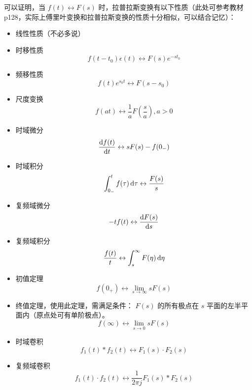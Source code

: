 \documentclass[UTF8,a4paper,11pt]{article}
\begin{document}
可以证明，当 $f(t)\leftrightarrow F(s)$ 时，拉普拉斯变换有以下性质（此处可参考教材p128，实际上傅里叶变换和拉普拉斯变换的性质十分相似，可以结合记忆）：
\begin{itemize}
\item 线性性质（不必多说）
\item 时移性质
\begin{equation}
f(t-t_0)\epsilon(t)\leftrightarrow F(s)e^{-st_0}
\end{equation}
\item 频移性质
\begin{equation}
f(t)e^{s_0 t}\leftrightarrow F(s-s_0)
\end{equation}
\item 尺度变换
\begin{equation}
f(at)\leftrightarrow \frac{1}{a}F(\frac{s}{a}), a>0
\end{equation}
\item 时域微分
\begin{equation}
\frac{{\rm d}f(t)}{{\rm d}t}\leftrightarrow sF(s)-f(0_-)
\end{equation}
\item 时域积分
\begin{equation}
\int_{0_-}^t {f(\tau)} \,{\rm d}\tau\leftrightarrow\frac{F(s)}{s}
\end{equation}
\item 复频域微分
\begin{equation}
-tf(t)\leftrightarrow \frac{{\rm d}F(s)}{{\rm d}s}
\end{equation}
\item 复频域积分
\begin{equation}
\frac{f(t)}{t}\leftrightarrow \int_s^{\infty} {F(\eta)} \,{\rm d}\eta
\end{equation}
\item 初值定理
\begin{equation}
f(0_+)\leftrightarrow \lim_{s \to \infty}sF(s)
\end{equation}
\item 终值定理，使用此定理，需满足条件： $F(s)$ 的所有极点在 $s$ 平面的左半平面内（原点处可有单阶极点）。
\begin{equation}
f(\infty)\leftrightarrow \lim_{s \to 0}sF(s)
\end{equation}
\item 时域卷积
\begin{equation}
f_1(t)*f_2(t)\leftrightarrow F_1(s)\cdot F_2(s)
\end{equation}
\item 复频域卷积
\begin{equation}
f_1(t)\cdot f_2(t)\leftrightarrow \frac{1}{2\pi j}F_1(s)*F_2(s)
\end{equation}
\end{itemize} 
\end{document}

